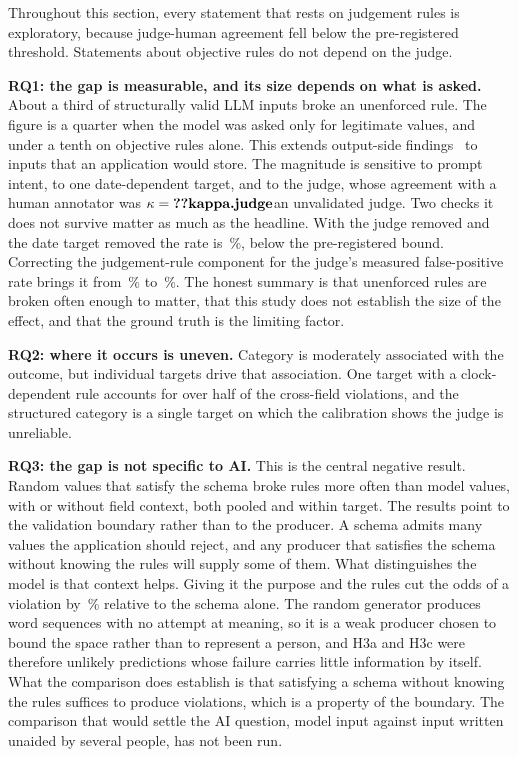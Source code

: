 \documentclass[conference]{IEEEtran}
\begin{document}
\ifjudgeweak Throughout this section, every statement that rests on judgement rules is exploratory,
because judge-human agreement fell below the pre-registered threshold. Statements about objective
rules do not depend on the judge.\fi

\textbf{RQ1: the gap is measurable, and its size depends on what is asked.} About a third of
structurally valid LLM inputs broke an unenforced rule. The figure is a quarter when the model was asked
only for legitimate values, and under a tenth on objective rules alone. This extends output-side
findings~\cite{li2026orderbench,singh2026sob,wrenn2026enterprise} to inputs that an application would
store. The magnitude is sensitive to prompt intent, to one date-dependent target, and to
\ifhumanlabels the judge, whose agreement with a human annotator was $\kappa=\R{kappa.judge}$\else an
unvalidated judge\fi. Two checks it does not survive matter as much as the headline. With the judge removed and the date
target removed the rate is \,\%, below the pre-registered bound. Correcting the
judgement-rule component for the judge's measured false-positive rate brings it from \,\%
to \,\%. The honest summary is that unenforced rules are broken often enough to
matter, that this study does not establish the size of the effect, and that the ground truth is the
limiting factor.

\textbf{RQ2: where it occurs is uneven.} Category is moderately associated with the outcome, but
individual targets drive that association. One target with a clock-dependent rule accounts for over
half of the cross-field violations, and the structured category is a single target on which the
calibration shows the judge is unreliable.

\textbf{RQ3: the gap is not specific to AI.} This is the central negative result. Random values that
satisfy the schema broke rules more often than model values, with or without field context, both pooled
and within target. The results point to the validation boundary rather than to the producer. A schema
admits many values the application should reject, and any producer that satisfies the schema without
knowing the rules will supply some of them. What distinguishes the model is that context helps. Giving
it the purpose and the rules cut the odds of a violation by \,\% relative to the
schema alone. The random generator produces word sequences with no attempt at meaning, so it is a weak producer
chosen to bound the space rather than to represent a person, and H3a and H3c were therefore unlikely
predictions whose failure carries little information by itself. What the comparison does establish is
that satisfying a schema without knowing the rules suffices to produce violations, which is a property
of the boundary. The comparison that would settle the AI question, model input against input written
unaided by several people, has not been run.
\end{document}
